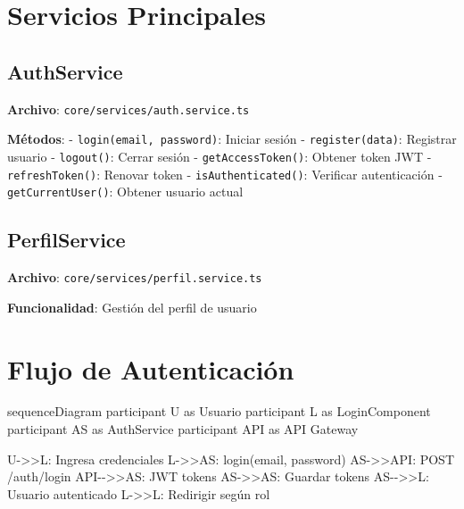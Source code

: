 \documentclass[
  spanish,
  11pt,
  letterpaper,
]{book}
\newenvironment{Shaded}{\begin{snugshade}}{\end{snugshade}}
\newcommand{\NormalTok}[1]{\textcolor[rgb]{0.00,0.23,0.31}{#1}}
\begin{document}
\section{Servicios Principales}\label{servicios-principales}

\subsection{AuthService}\label{authservice-1}

\textbf{Archivo}: \texttt{core/services/auth.service.ts}

\textbf{Métodos}: - \texttt{login(email,\ password)}: Iniciar sesión -
\texttt{register(data)}: Registrar usuario - \texttt{logout()}: Cerrar
sesión - \texttt{getAccessToken()}: Obtener token JWT -
\texttt{refreshToken()}: Renovar token - \texttt{isAuthenticated()}:
Verificar autenticación - \texttt{getCurrentUser()}: Obtener usuario
actual

\subsection{PerfilService}\label{perfilservice}

\textbf{Archivo}: \texttt{core/services/perfil.service.ts}

\textbf{Funcionalidad}: Gestión del perfil de usuario

\section{Flujo de Autenticación}\label{flujo-de-autenticaciuxf3n-1}

\begin{Shaded}
\begin{Highlighting}[]
\NormalTok{sequenceDiagram}
\NormalTok{    participant U as Usuario}
\NormalTok{    participant L as LoginComponent}
\NormalTok{    participant AS as AuthService}
\NormalTok{    participant API as API Gateway}
    
\NormalTok{    U{-}\textgreater{}\textgreater{}L: Ingresa credenciales}
\NormalTok{    L{-}\textgreater{}\textgreater{}AS: login(email, password)}
\NormalTok{    AS{-}\textgreater{}\textgreater{}API: POST /auth/login}
\NormalTok{    API{-}{-}\textgreater{}\textgreater{}AS: JWT tokens}
\NormalTok{    AS{-}\textgreater{}\textgreater{}AS: Guardar tokens}
\NormalTok{    AS{-}{-}\textgreater{}\textgreater{}L: Usuario autenticado}
\NormalTok{    L{-}\textgreater{}\textgreater{}L: Redirigir según rol}
\end{Highlighting}
\end{Shaded}
\end{document}
